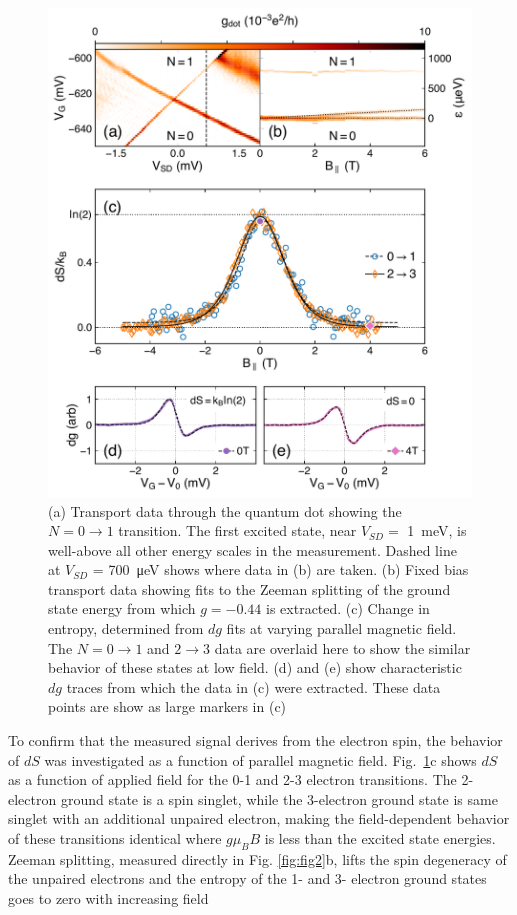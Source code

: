 \documentclass[preprint,showpacs,preprintnumbers,amsmath,amssymb,pra,aps,superscriptaddress]{revtex4-1}
\begin{document}
\begin{figure}
        \includegraphics[width=1.0\columnwidth]{../figures/figure_3.pdf}
        \caption{\label{fig:fig3}(a) Transport data through the quantum dot showing the $N=0 \rightarrow 1$ transition. The first excited state, near $V_{SD} = $ \SI{1}{\milli\electronvolt}, is well-above all other energy scales in the measurement. Dashed line at $V_{SD}$ = \SI{700}{\micro\electronvolt} shows where data in (b) are taken. (b) Fixed bias transport data showing fits to the Zeeman splitting of the ground state energy from which $g = -0.44$ is extracted. (c) Change in entropy, determined from $dg$ fits at varying parallel magnetic field. The $N=0 \rightarrow 1$ and $2 \rightarrow 3$ data are overlaid here to show the similar behavior of these states at low field. (d) and (e) show characteristic $dg$ traces from which the data in (c) were extracted. These data points are show as large markers in (c)}
\end{figure}

To confirm that the measured signal derives from the electron spin, the behavior of $dS$ was investigated as a function of parallel magnetic field. Fig.~\ref{fig:fig3}c shows $dS$ as a function of applied field for the 0-1 and 2-3 electron transitions. The 2-electron ground state is a spin singlet, while the 3-electron ground state is same singlet with an additional unpaired electron, making the field-dependent behavior of these transitions identical where $g \mu_{B} B$ is less than the excited state energies. Zeeman splitting, measured directly in Fig. \ref{fig:fig2}b, lifts the spin degeneracy of the unpaired electrons and the entropy of the 1- and 3- electron ground states goes to zero with increasing field
\end{document}
